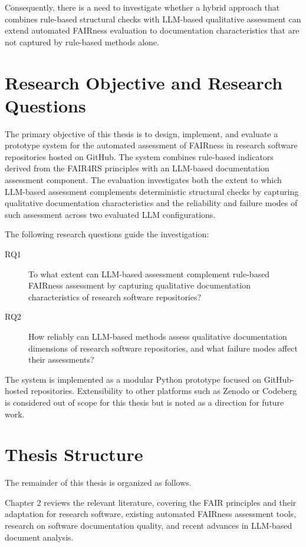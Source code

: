 Consequently, there is a need to investigate whether a hybrid approach
that combines rule-based structural checks with LLM-based qualitative
assessment can extend automated FAIRness evaluation to documentation
characteristics that are not captured by rule-based methods alone.

\section{Research Objective and Research Questions}
The primary objective of this thesis is to design, implement, and
evaluate a prototype system for the automated assessment of FAIRness
in research software repositories hosted on GitHub. The system
combines rule-based indicators derived from the FAIR4RS principles
\cite{barker2022fair4rs} with an LLM-based documentation assessment
component. The evaluation investigates both the extent to which
LLM-based assessment complements deterministic structural checks by
capturing qualitative documentation characteristics and the
reliability and failure modes of such assessment across two evaluated
LLM configurations.

The following research questions guide the investigation:

\begin{description}
    \item[RQ1] To what extent can LLM-based assessment complement
rule-based FAIRness assessment by capturing qualitative documentation
characteristics of research software repositories?
    
   \item[RQ2] How reliably can LLM-based methods assess qualitative
documentation dimensions of research software repositories, and what
failure modes affect their assessments?

\end{description}

The system is implemented as a modular Python prototype focused on 
GitHub-hosted repositories. Extensibility to other platforms such as 
Zenodo or Codeberg is considered out of scope for this thesis but is 
noted as a direction for future work.

\section{Thesis Structure}

The remainder of this thesis is organized as follows.

Chapter 2 reviews the relevant literature, covering the FAIR 
principles and their adaptation for research software, existing 
automated FAIRness assessment tools, research on software 
documentation quality, and recent advances in LLM-based document 
analysis.

